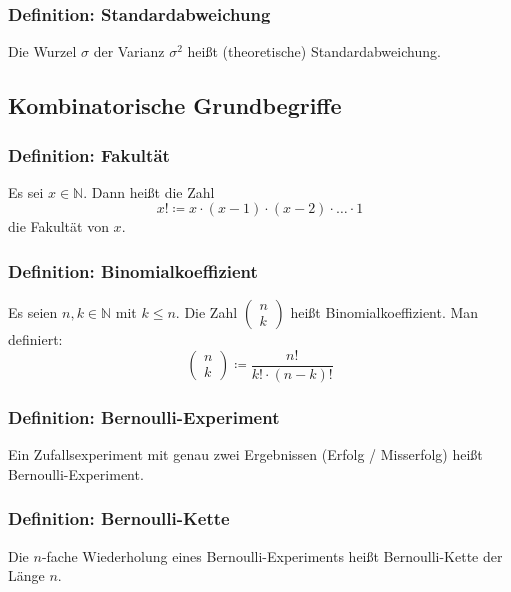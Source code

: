\documentclass{article}
\begin{document}
  \subsubsection{Definition: Standardabweichung}
  Die Wurzel $\sigma$ der Varianz $\sigma^2$ heißt (theoretische) Standardabweichung.
  
  \subsection{Kombinatorische Grundbegriffe}
  
  \subsubsection{Definition: Fakultät}
  Es sei $x \in \mathbb{N}$. Dann heißt die Zahl 
  \begin{equation*}
  	x! \coloneqq x \cdot (x - 1) \cdot (x - 2) \cdot \ldots \cdot 1
  \end{equation*}
  die Fakultät von $x$.
  
  \subsubsection{Definition: Binomialkoeffizient}
  Es seien $n, k \in \mathbb{N}$ mit $k \leqslant n$. Die Zahl 
  $\begin{pmatrix}
  	n \\
  	k
  \end{pmatrix}$
  heißt Binomialkoeffizient. Man definiert: 
  \begin{equation*}
  	\begin{pmatrix}
  		n \\
  		k
  	\end{pmatrix}
  	\coloneqq \frac{n!}{k! \cdot (n-k)!}
  \end{equation*}
  
  \subsubsection{Definition: Bernoulli-Experiment}
  Ein Zufallsexperiment mit genau zwei Ergebnissen (Erfolg / Misserfolg) heißt Bernoulli-Experiment.
  
  \subsubsection{Definition: Bernoulli-Kette}
  Die $n$-fache Wiederholung eines Bernoulli-Experiments heißt Bernoulli-Kette der Länge $n$.
  
\end{document}
